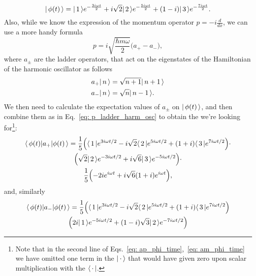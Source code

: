 \begin{description}
\begin{enumerate}[(a)]
        \begin{equation}
            | \, \phi (t) \, \rangle = | \, 1 \, \rangle e^{-\frac{3i \omega t}{2}} + i \sqrt{2} | \, 2 \, \rangle e^{-\frac{5i \omega t}{2}} + (1-i) | \, 3 \, \rangle e^{-\frac{7i \omega t}{2}}.
        \end{equation}
        Also, while we know the expression of the momentum operator $ p = -i \frac{d}{dx} $, we can use a more handy formula
        \begin{equation}
            \label{eq: p_ladder_harm_osc}
            p = i \sqrt{ \frac{\hbar m \omega}{2} } \bigl( a_+ - a_- \bigr),
        \end{equation}
        where $a_\pm$ are the ladder operators, that act on the eigenstates of the Hamiltonian of the harmonic oscillator as follows
        \begin{subequations}
            \label{eq: ladder_operators_harm_osc}
            \begin{align}
                a_+ | \, n \, \rangle & = \sqrt{n+1} | \, n+1 \, \rangle \\
                a_- | \, n \, \rangle & = \sqrt{n} | \, n-1 \, \rangle.    
            \end{align}
        \end{subequations}
        We then need to calculate the expectation values of $a_\pm$ on $| \, \phi (t) \, \rangle$, and then combine them as in Eq.~\eqref{eq: p_ladder_harm_osc} to obtain the \epv we're looking for\footnote{Note that in the second line of Eqs.~\eqref{eq: ap_phi_time},~\eqref{eq: am_phi_time} we have omitted one term in the $| \, \cdot \, \rangle$ that would have given zero upon scalar multiplication with the $\langle \, \cdot \, |$.}:
        \begin{gather}
            \langle \, \phi (t) | a_+ | \phi(t) \, \rangle = \frac{1}{5} \Bigl( \langle \, 1 \, | e^{3 i \omega t/2} - i\sqrt{2} \langle \, 2 \, | e^{5 i \omega t/2} + (1+i) \langle \, 3 \, | e^{7 i \omega t/2} \Bigr) \cdot \notag \\
            \Bigl( \sqrt{2} | \, 2 \, \rangle e^{-3 i \omega t/2} + i \sqrt{6} | \, 3 \, \rangle e^{-5 i \omega t/2} \Bigr) \cdot \notag \\
            \frac{1}{5} \Bigl( -2i e^{i \omega t} + i \sqrt{6} (1+i) e^{i \omega t} \Bigr) \label{eq: ap_phi_time},
        \end{gather}
        and, similarly
        \begin{gather}
            \mean{\phi (t) | a_- | \phi(t)} = \frac{1}{5} \Bigl( \br{1} e^{3 i \omega t/2} - i\sqrt{2} \br{2} e^{5 i \omega t/2} + (1+i) \br{3} e^{7 i \omega t/2} \Bigr) \notag \\
            \Bigl( 2 i \ke{1} e^{-5 i \omega t/2} + (1-i) \sqrt{3} \ke{2} e^{-7 i \omega t/2} \Bigr) \notag \\

\end{gather}
\end{enumerate}
\end{description}
